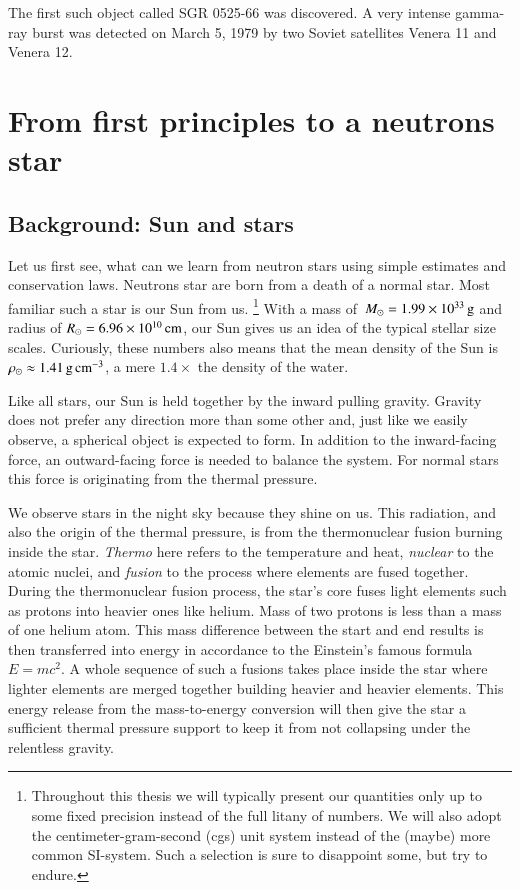 The first such object called SGR 0525-66 was discovered.
A very intense gamma-ray burst was detected on March 5, 1979 by two Soviet satellites Venera 11 and Venera 12.\cite{MGI79}



\section{From first principles to a neutrons star}

\subsection{Background: Sun and stars}
Let us first see, what can we learn from neutron stars using simple estimates and conservation laws.
Neutrons star are born from a death of a normal star.%
Most familiar such a star is our Sun  \cm from us.%
\footnote{Throughout this thesis we will typically present our quantities only up to some fixed precision instead of the full litany of numbers.
We will also adopt the centimeter-gram-second (cgs) unit system instead of the (maybe) more common SI-system. 
Such a selection is sure to disappoint some, but try to endure.
}
With a mass of $\, M_{\odot} = 1.99 \times 10^{33} \, \mathrm{g}$ and radius of $R_{\odot} = 6.96 \times 10^{10} \, \mathrm{cm}$, our Sun gives us an idea of the typical stellar size scales.
Curiously, these numbers also means that the mean density of the Sun is $\rho_{\odot} \approx 1.41 \, \mathrm{g}\,\mathrm{cm}^{-3} $, a mere $1.4\times$ the density of the water.

Like all stars, our Sun is held together by the inward pulling gravity.
Gravity does not prefer any direction more than some other and, just like we easily observe, a spherical object is expected to form.
In addition to the inward-facing force, an outward-facing force is needed to balance the system.
For normal stars this force is originating from the thermal pressure.

We observe stars in the night sky because they shine on us.%
This radiation, and also the origin of the thermal pressure, is from the thermonuclear fusion burning inside the star.
\textit{Thermo} here refers to the temperature and heat, \textit{nuclear} to the atomic nuclei, and \textit{fusion} to the process where elements are fused together.
During the thermonuclear fusion process, the star's core fuses light elements such as protons into heavier ones like helium.
Mass of two protons is less than a mass of one helium atom.
This mass difference between the start and end results is then transferred into energy in accordance to the Einstein's famous formula $E = mc^2$.
A whole sequence of such a fusions takes place inside the star where lighter elements are merged together building heavier and heavier elements.
This energy release from the mass-to-energy conversion will then give the star a sufficient thermal pressure support to keep it from not collapsing under the relentless gravity.

